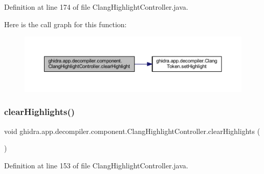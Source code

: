 Definition at line 174 of file Clang\+Highlight\+Controller.\+java.

Here is the call graph for this function\+:
\nopagebreak
\begin{figure}[H]
\begin{center}
\leavevmode
\includegraphics[width=350pt]{classghidra_1_1app_1_1decompiler_1_1component_1_1_clang_highlight_controller_a059003e77f6c6d6ecd7727c6840aefb8_cgraph}
\end{center}
\end{figure}
\mbox{\label{classghidra_1_1app_1_1decompiler_1_1component_1_1_clang_highlight_controller_a23d3b639418118f916813e02d99d8025}} 
\subsubsection{\texorpdfstring{clearHighlights()}{clearHighlights()}}
{\footnotesize\ttfamily void ghidra.\+app.\+decompiler.\+component.\+Clang\+Highlight\+Controller.\+clear\+Highlights (\begin{DoxyParamCaption}{ }\end{DoxyParamCaption})\hspace{0.3cm}{\ttfamily [inline]}}



Definition at line 153 of file Clang\+Highlight\+Controller.\+java.

